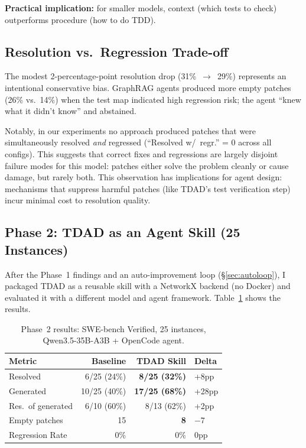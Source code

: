\documentclass[sigconf,nonacm]{acmart}
\begin{document}
\textbf{Practical implication:} for smaller models, context (which tests to
check) outperforms procedure (how to do TDD).

\subsection{Resolution vs.\ Regression Trade-off}

The modest 2-percentage-point resolution drop (31\%~$\to$~29\%) represents an
intentional conservative bias.  GraphRAG agents produced more empty patches
(26\% vs.\ 14\%) when the test map indicated high regression risk; the agent
``knew what it didn't know'' and abstained.

Notably, in our experiments no approach produced patches that were simultaneously resolved
\emph{and} regressed (``Resolved w/~regr.'' = 0 across all configs).  This
suggests that correct fixes and regressions are largely disjoint failure
modes for this model: patches either solve the problem cleanly or cause
damage, but rarely both.  This observation has implications for agent design:
mechanisms that suppress harmful patches (like \textsc{TDAD}'s test
verification step) incur minimal cost to resolution quality.

\subsection{Phase 2: TDAD as an Agent Skill (25 Instances)}

After the Phase~1 findings and an auto-improvement loop
(\S\ref{sec:autoloop}), I packaged \textsc{TDAD} as a reusable skill with a
NetworkX backend (no Docker) and evaluated it with a different model and agent
framework.  Table~\ref{tab:phase2} shows the results.

\begin{table}[t]
\caption{Phase~2 results: SWE-bench Verified, 25 instances,
  Qwen3.5-35B-A3B + OpenCode agent.}
\label{tab:phase2}
\small
\begin{tabular}{@{}lrrl@{}}
\toprule
\textbf{Metric} & \textbf{Baseline} & \textbf{TDAD Skill} & \textbf{Delta} \\
\midrule
Resolved          & 6/25 (24\%) & \textbf{8/25 (32\%)} & +8pp \\
Generated         & 10/25 (40\%) & \textbf{17/25 (68\%)} & +28pp \\
Res.\ of generated & 6/10 (60\%) & 8/13 (62\%) & +2pp \\
Empty patches     & 15           & \textbf{8}            & $-7$ \\
Regression Rate   & 0\%          & 0\%                   & 0pp \\
\bottomrule
\end{tabular}
\end{table}
\end{document}
